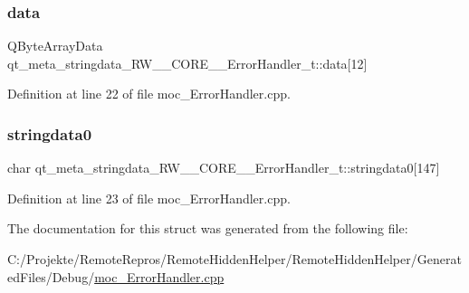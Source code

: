\subsubsection{\texorpdfstring{data}{data}}
{\footnotesize\ttfamily Q\+Byte\+Array\+Data qt\+\_\+meta\+\_\+stringdata\+\_\+\+R\+W\+\_\+\+\_\+\+C\+O\+R\+E\+\_\+\+\_\+\+Error\+Handler\+\_\+t\+::data\mbox{[}12\mbox{]}}



Definition at line 22 of file moc\+\_\+\+Error\+Handler.\+cpp.

\hypertarget{structqt__meta__stringdata___r_w_____c_o_r_e_____error_handler__t_a89162feda77830216ace7a3f2523f5ad}{}\label{structqt__meta__stringdata___r_w_____c_o_r_e_____error_handler__t_a89162feda77830216ace7a3f2523f5ad} 
\subsubsection{\texorpdfstring{stringdata0}{stringdata0}}
{\footnotesize\ttfamily char qt\+\_\+meta\+\_\+stringdata\+\_\+\+R\+W\+\_\+\+\_\+\+C\+O\+R\+E\+\_\+\+\_\+\+Error\+Handler\+\_\+t\+::stringdata0\mbox{[}147\mbox{]}}



Definition at line 23 of file moc\+\_\+\+Error\+Handler.\+cpp.



The documentation for this struct was generated from the following file\+:\begin{DoxyCompactItemize}
\item 
C\+:/\+Projekte/\+Remote\+Repros/\+Remote\+Hidden\+Helper/\+Remote\+Hidden\+Helper/\+Generated\+Files/\+Debug/\hyperlink{moc___error_handler_8cpp}{moc\+\_\+\+Error\+Handler.\+cpp}\end{DoxyCompactItemize}
